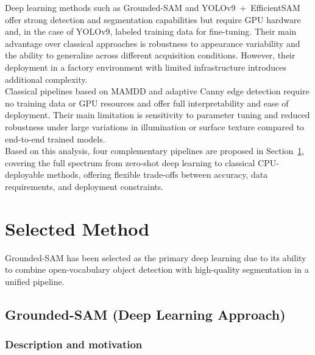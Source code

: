 \documentclass[11pt]{article}
\begin{document}
Deep learning methods such as Grounded-SAM and YOLOv9~+~EfficientSAM offer strong
detection and segmentation capabilities but require GPU hardware and, in the case
of YOLOv9, labeled training data for fine-tuning. Their main advantage over
classical approaches is robustness to appearance variability and the ability to
generalize across different acquisition conditions. However, their deployment in a
factory environment with limited infrastructure introduces additional complexity.\\

Classical pipelines based on MAMDD and adaptive Canny edge detection require no
training data or GPU resources and offer full interpretability and ease of
deployment. Their main limitation is sensitivity to parameter tuning and reduced
robustness under large variations in illumination or surface texture compared to
end-to-end trained models.\\

Based on this analysis, four complementary pipelines are proposed in
Section~\ref{sec:selectedMethod}, covering the full spectrum from zero-shot deep
learning to classical CPU-deployable methods, offering flexible trade-offs between
accuracy, data requirements, and deployment constraints.\\
\section{Selected Method}
\label{sec:selectedMethod}

Grounded-SAM \cite{RenGroundedSAM2024} has been selected as the primary deep 
learning due to its ability to combine 
open-vocabulary object detection with high-quality segmentation in a unified pipeline.

\subsection{Grounded-SAM (Deep Learning Approach)}

\subsubsection{Description and motivation}
\end{document}
